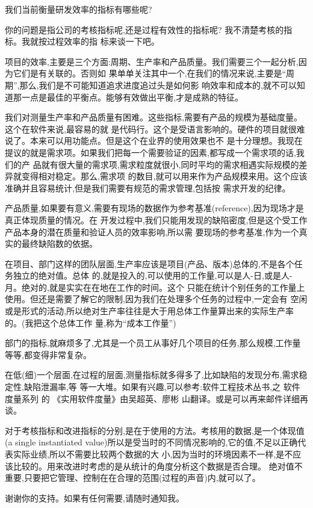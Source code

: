 \documentclass[11pt]{article}
\begin{document}
\qlogo \begin{staff}
我们当前衡量研发效率的指标有哪些呢?
\end{staff}

\begin{yang}
  \ylogo 你的问题是指公司的考核指标呢,还是过程有效性的指标呢? 我不清楚考核的指标。我就按过程效率的指
  标来谈一下吧。

  项目的效率,主要是三个方面:周期、生产率和产品质量。我们需要三个一起分析,因为它们是有关联的。否则如
  果单单关注其中一个,在我们的情况来说,主要是``周期'',那么,我们是不可能知道追求进度追过头是如何影
  响效率和成本的,就不可以知道那一点是最佳的平衡点。能够有效做出平衡,才是成熟的特征。

  我们对测量生产率和产品质量有困难。这些指标,需要有产品的规模为基础度量。这个在软件来说,最容易的就
  是代码行。这个是受语言影响的。硬件的项目就很难说了。本来可以用功能点。但是这个在业界的使用效果也不
  是十分理想。我现在提议的就是需求项。如果我们把每一个需要验证的因素,都写成一个需求项的话,我们的产
  品就有很大量的需求项,需求粒度就很小,同时平均的需求相遇实际规模的差异就变得相对稳定。那么,需求项
  的数目,就可以用来作为产品规模来用。这个应该准确并且容易统计,但是我们需要有规范的需求管理,包括按
  需求开发的纪律。

  产品质量,如果要有意义,需要有现场的数据作为参考基准(reference),因为现场才是真正体现质量的情况。在
  开发过程中,我们只能用发现的缺陷密度,但是这个受工作产品本身的潜在质量和验证人员的效率影响,所以需
  要现场的参考基准,作为一个真实的最终缺陷数的依据。

  在项目、部门这样的团队层面,生产率应该是项目(产品、版本)总体的,不是各个任务独立的绝对值。总体
  的,就是投入的,可以使用的工作量,可以是人-日,或是人-月。绝对的,就是实实在在地在工作的时间。这个
  只能在统计个别任务的工作量上使用。但还是需要了解它的限制,因为我们在处理多个任务的过程中,一定会有
  空闲或是形式的活动,所以绝对生产率往往是大于用总体工作量算出来的实际生产率的。(我把这个总体工作
  量,称为``成本工作量'')

  部门的指标,就麻烦多了,尤其是一个员工从事好几个项目的任务,那么规模,工作量等等,都变得非常复杂。

  在低(细)一个层面,在过程的层面,测量指标就多得多了,比如缺陷的发现分布,需求稳定性,缺陷泄漏率,等
  等一大堆。如果有兴趣,可以参考:软件工程技术丛书,之 软件度量系列 的 《实用软件度量》由吴超英、廖彬
  山翻译。或是可以再来邮件详细再谈。

  对于考核指标和改进指标的分别,是在于使用的方法。考核用的数据,是一个体现值(a single instantiated
  value)所以是受当时的不同情况影响的,它的值,不足以正确代表实际业绩,所以不需要比较两个数据的大
  小,因为当时的环境因素不一样,是不应该比较的。用来改进时考虑的是从统计的角度分析这个数据是否合理。
  绝对值不重要,只要把它管理、控制在在合理的范围(过程的声音)内,就可以了。

  谢谢你的支持。如果有任何需要,请随时通知我。
\end{yang}
\end{document}
